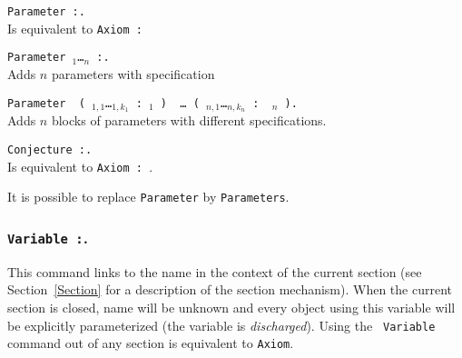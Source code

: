 \begin{ErrMsgs}
\item {}
\end{ErrMsgs}

\begin{Variants} 
\item {\tt Parameter {\ident} :{\term}.} \\
  Is equivalent to {\tt Axiom {\ident} : {\term}}

\item {\tt Parameter {\ident$_1$}\ldots{\ident$_n$} {\tt :}{\term}.}\\
  Adds $n$ parameters with specification {\term}

\item
 {\tt Parameter\,%
(\,{\ident$_{1,1}$}\ldots{\ident$_{1,k_1}$}\,{\tt :}\,{\term$_1$} {\tt )}\,%
\ldots\,{\tt (}\,{\ident$_{n,1}$}\ldots{\ident$_{n,k_n}$}\,{\tt :}\,%
{\term$_n$} {\tt )}.}\\ 
  Adds $n$ blocks of parameters with different specifications.

\item {\tt Conjecture {\ident} :{\term}.}\\
  Is equivalent to {\tt Axiom {\ident} : {\term}}.
\end{Variants}

 It is possible to replace {\tt Parameter} by
{\tt Parameters}.


\subsubsection{{\tt Variable {\ident} :{\term}}.
}

This command links {\term} to the name {\ident} in the context of the
current section (see Section~\ref{Section} for a description of the section
mechanism). When the current section is closed, name {\ident} will be
unknown and every object using this variable will be explicitly
parameterized (the variable is {\em discharged}). Using the {\tt
Variable} command out of any section is equivalent to {\tt Axiom}.

\begin{ErrMsgs}
\item {}
\end{ErrMsgs}

